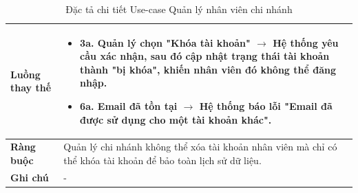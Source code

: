 \begin{table}[H]
\begin{tabular}{|p{4cm}|p{10cm}|}
\textbf{Luồng thay thế} 
& 
\begin{itemize}
    \item 3a. Quản lý chọn "Khóa tài khoản" $\rightarrow$ Hệ thống yêu cầu xác nhận, sau đó cập nhật trạng thái tài khoản thành "bị khóa", khiến nhân viên đó không thể đăng nhập.
    \item 6a. Email đã tồn tại $\rightarrow$ Hệ thống báo lỗi "Email đã được sử dụng cho một tài khoản khác".
\end{itemize} \\ 
\hline

\textbf{Ràng buộc} 
& Quản lý chi nhánh không thể xóa tài khoản nhân viên mà chỉ có thể khóa tài khoản để bảo toàn lịch sử dữ liệu. \\ 
\hline

\textbf{Ghi chú} 
& - \\ 
\hline
\end{tabular}
\caption{Đặc tả chi tiết Use-case Quản lý nhân viên chi nhánh}
\label{tab:staff-management-spec}
\end{table}


